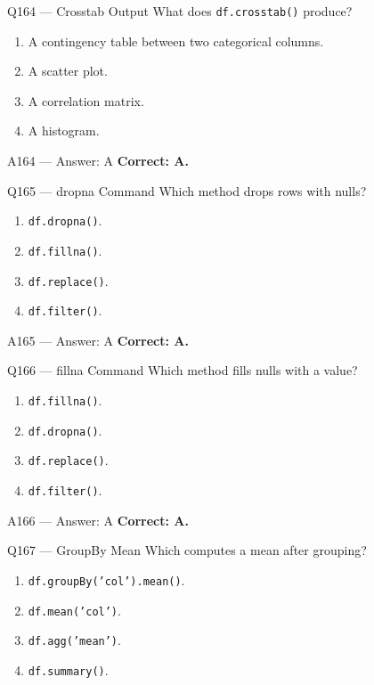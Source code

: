 \documentclass[aspectratio=169,9pt]{beamer}
\begin{document}
	\begin{frame}{Q164 --- Crosstab Output}
		What does \texttt{df.crosstab()} produce?
		\begin{enumerate}[label=\Alph*.]
			\item A contingency table between two categorical columns.
			\item A scatter plot.
			\item A correlation matrix.
			\item A histogram.
		\end{enumerate}
	\end{frame}
	
	\begin{frame}{A164 --- Answer: A}
		\textbf{Correct: A.}
	\end{frame}
	
	\begin{frame}{Q165 --- dropna Command}
		Which method drops rows with nulls?
		\begin{enumerate}[label=\Alph*.]
			\item \texttt{df.dropna()}.
			\item \texttt{df.fillna()}.
			\item \texttt{df.replace()}.
			\item \texttt{df.filter()}.
		\end{enumerate}
	\end{frame}
	
	\begin{frame}{A165 --- Answer: A}
		\textbf{Correct: A.}
	\end{frame}
	
	\begin{frame}{Q166 --- fillna Command}
		Which method fills nulls with a value?
		\begin{enumerate}[label=\Alph*.]
			\item \texttt{df.fillna()}.
			\item \texttt{df.dropna()}.
			\item \texttt{df.replace()}.
			\item \texttt{df.filter()}.
		\end{enumerate}
	\end{frame}
	
	\begin{frame}{A166 --- Answer: A}
		\textbf{Correct: A.}
	\end{frame}
	
	\begin{frame}{Q167 --- GroupBy Mean}
		Which computes a mean after grouping?
		\begin{enumerate}[label=\Alph*.]
			\item \texttt{df.groupBy('col').mean()}.
			\item \texttt{df.mean('col')}.
			\item \texttt{df.agg('mean')}.
			\item \texttt{df.summary()}.
		\end{enumerate}
	\end{frame}
	
\end{document}
